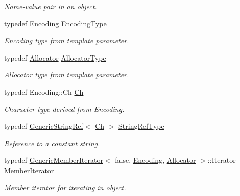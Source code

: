 \begin{DoxyCompactItemize}
\begin{DoxyCompactList}\small\item\em Name-\/value pair in an object. \end{DoxyCompactList}\item 
typedef \mbox{\hyperlink{classrapidjson_1_1_encoding}{Encoding}} \mbox{\hyperlink{classrapidjson_1_1_generic_value_a05906384808645a2e798d29a9b2d441d}{Encoding\+Type}}
\begin{DoxyCompactList}\small\item\em \mbox{\hyperlink{classrapidjson_1_1_encoding}{Encoding}} type from template parameter. \end{DoxyCompactList}\item 
typedef \mbox{\hyperlink{classrapidjson_1_1_allocator}{Allocator}} \mbox{\hyperlink{classrapidjson_1_1_generic_value_a5d47340c96346c5028fee4c9068d783d}{Allocator\+Type}}
\begin{DoxyCompactList}\small\item\em \mbox{\hyperlink{classrapidjson_1_1_allocator}{Allocator}} type from template parameter. \end{DoxyCompactList}\item 
typedef Encoding\+::\+Ch \mbox{\hyperlink{classrapidjson_1_1_generic_value_adcdbc7fa85a9a41b78966d7e0dcc2ac4}{Ch}}
\begin{DoxyCompactList}\small\item\em Character type derived from \mbox{\hyperlink{classrapidjson_1_1_encoding}{Encoding}}. \end{DoxyCompactList}\item 
typedef \mbox{\hyperlink{structrapidjson_1_1_generic_string_ref}{Generic\+String\+Ref}}$<$ \mbox{\hyperlink{classrapidjson_1_1_generic_value_adcdbc7fa85a9a41b78966d7e0dcc2ac4}{Ch}} $>$ \mbox{\hyperlink{classrapidjson_1_1_generic_value_a559eb9cea54364a35518b02f6d74f379}{String\+Ref\+Type}}
\begin{DoxyCompactList}\small\item\em Reference to a constant string. \end{DoxyCompactList}\item 
typedef \mbox{\hyperlink{classrapidjson_1_1_generic_member_iterator}{Generic\+Member\+Iterator}}$<$ false, \mbox{\hyperlink{classrapidjson_1_1_encoding}{Encoding}}, \mbox{\hyperlink{classrapidjson_1_1_allocator}{Allocator}} $>$\+::Iterator \mbox{\hyperlink{classrapidjson_1_1_generic_value_aca5596987335016c1a7c2a9467baf80b}{Member\+Iterator}}
\begin{DoxyCompactList}\small\item\em Member iterator for iterating in object. \end{DoxyCompactList}\item 

\end{DoxyCompactItemize}
